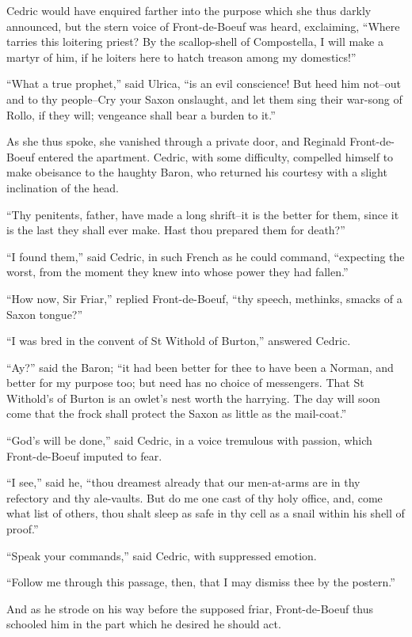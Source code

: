 Cedric would have enquired farther into the purpose which she thus
darkly announced, but the stern voice of Front-de-Boeuf was heard,
exclaiming, ``Where tarries this loitering priest? By the scallop-shell
of Compostella, I will make a martyr of him, if he loiters here to hatch
treason among my domestics!''

``What a true prophet,'' said Ulrica, ``is an evil conscience! But heed
him not--out and to thy people--Cry your Saxon onslaught, and let them
sing their war-song of Rollo, if they will; vengeance shall bear a
burden to it.''

As she thus spoke, she vanished through a private door, and Reginald
Front-de-Boeuf entered the apartment. Cedric, with some difficulty,
compelled himself to make obeisance to the haughty Baron, who returned
his courtesy with a slight inclination of the head.

``Thy penitents, father, have made a long shrift--it is the better for
them, since it is the last they shall ever make. Hast thou prepared them
for death?''

``I found them,'' said Cedric, in such French as he could command,
``expecting the worst, from the moment they knew into whose power they
had fallen.''

``How now, Sir Friar,'' replied Front-de-Boeuf, ``thy speech, methinks,
smacks of a Saxon tongue?''

``I was bred in the convent of St Withold of Burton,'' answered Cedric.

``Ay?'' said the Baron; ``it had been better for thee to have been a
Norman, and better for my purpose too; but need has no choice of
messengers. That St Withold's of Burton is an owlet's nest worth the
harrying. The day will soon come that the frock shall protect the Saxon
as little as the mail-coat.''

``God's will be done,'' said Cedric, in a voice tremulous with passion,
which Front-de-Boeuf imputed to fear.

``I see,'' said he, ``thou dreamest already that our men-at-arms are in
thy refectory and thy ale-vaults. But do me one cast of thy holy office,
and, come what list of others, thou shalt sleep as safe in thy cell as a
snail within his shell of proof.''

``Speak your commands,'' said Cedric, with suppressed emotion.

``Follow me through this passage, then, that I may dismiss thee by the
postern.''

And as he strode on his way before the supposed friar, Front-de-Boeuf
thus schooled him in the part which he desired he should act.

